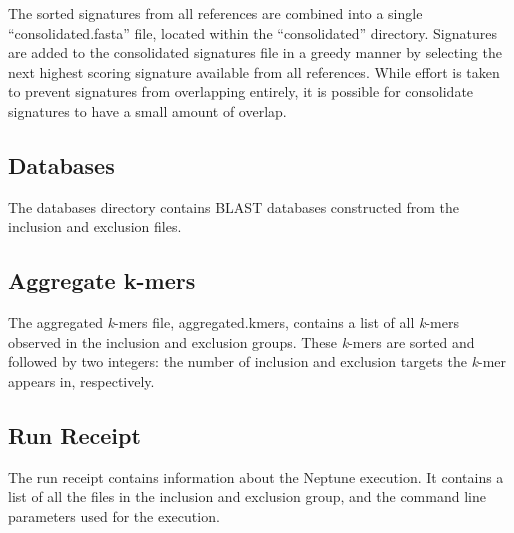 \documentclass[a4paper,10pt]{article}
\begin{document}
The sorted signatures from all references are combined into a single ``consolidated.fasta'' file, located within the ``consolidated'' directory. Signatures are added to the consolidated signatures file in a greedy manner by selecting the next highest scoring signature available from all references. While effort is taken to prevent signatures from overlapping entirely, it is possible for consolidate signatures to have a small amount of overlap.

\subsection{Databases}

The databases directory contains BLAST databases constructed from the inclusion and exclusion files.

\subsection{Aggregate k-mers}

The aggregated \textit{k}-mers file, aggregated.kmers, contains a list of all \textit{k}-mers observed in the inclusion and exclusion groups. These \textit{k}-mers are sorted and followed by two integers: the number of inclusion and exclusion targets the \textit{k}-mer appears in, respectively.

\subsection{Run Receipt}

The run receipt contains information about the Neptune execution. It contains a list of all the files in the inclusion and exclusion group, and the command line parameters used for the execution.
\end{document}
